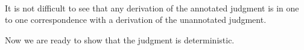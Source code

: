 {\centering
{}}\\

It is not difficult to see that any derivation of the annotated judgment
is in one to one correspondence with a derivation of the unannotated 
judgment.

Now we are ready to show that the judgment is deterministic.\\

